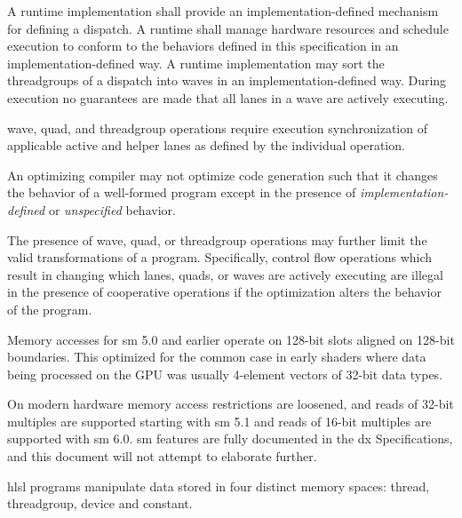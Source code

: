
\p A runtime implementation shall provide an implementation-defined mechanism
for defining a \gls{dispatch}. A runtime shall manage hardware resources and
schedule execution to conform to the behaviors defined in this specification in
an implementation-defined way. A runtime implementation may sort the
\gls{threadgroup}s of a \gls{dispatch} into \gls{wave}s in an
implementation-defined way. During execution no guarantees are made that all
\gls{lane}s in a \gls{wave} are actively executing.

\p \gls{wave}, \gls{quad}, and \gls{threadgroup} operations require execution
synchronization of applicable active and helper \gls{lane}s as defined by the
individual operation.


\p An optimizing compiler may not optimize code generation such that it changes
the behavior of a well-formed program except in the presence of
\textit{implementation-defined} or \textit{unspecified} behavior.

\p The presence of \gls{wave}, \gls{quad}, or \gls{threadgroup} operations
may further limit the valid transformations of a program. Specifically, control
flow operations which result in changing which \gls{lane}s, \gls{quad}s, or
\gls{wave}s are actively executing are illegal in the presence of cooperative
operations if the optimization alters the behavior of the program.


\p Memory accesses for \gls{sm} 5.0 and earlier operate on 128-bit slots aligned
on 128-bit boundaries. This optimized for the common case in early shaders where
data being processed on the GPU was usually 4-element vectors of 32-bit data
types.

\p On modern hardware memory access restrictions are loosened, and reads of
32-bit multiples are supported starting with \gls{sm} 5.1 and reads of 16-bit
multiples are supported with \gls{sm} 6.0. \gls{sm} features are fully
documented in the \gls{dx} Specifications, and this document will not attempt to
elaborate further.


\p \acrshort{hlsl} programs manipulate data stored in four distinct memory
spaces: thread, threadgroup, device and constant.

